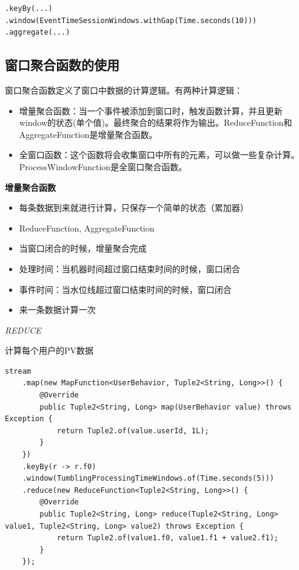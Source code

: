 \documentclass[cn,11pt,chinese]{elegantbook}
\begin{document}
\begin{verbatim}
.keyBy(...)
.window(EventTimeSessionWindows.withGap(Time.seconds(10)))
.aggregate(...)
\end{verbatim}

\subsection{窗口聚合函数的使用}

窗口聚合函数定义了窗口中数据的计算逻辑。有两种计算逻辑：

\begin{itemize}
    \item 增量聚合函数：当一个事件被添加到窗口时，触发函数计算，并且更新window的状态(单个值)。最终聚合的结果将作为输出。ReduceFunction和AggregateFunction是增量聚合函数。
    \item 全窗口函数：这个函数将会收集窗口中所有的元素，可以做一些复杂计算。ProcessWindowFunction是全窗口聚合函数。
\end{itemize}

\textbf{增量聚合函数}

\begin{itemize}
    \item 每条数据到来就进行计算，只保存一个简单的状态（累加器）
    \item ReduceFunction, AggregateFunction
    \item 当窗口闭合的时候，增量聚合完成
    \item 处理时间：当机器时间超过窗口结束时间的时候，窗口闭合
    \item 事件时间：当水位线超过窗口结束时间的时候，窗口闭合
    \item 来一条数据计算一次
\end{itemize}

\textit{REDUCE}

计算每个用户的PV数据

\begin{verbatim}
stream
    .map(new MapFunction<UserBehavior, Tuple2<String, Long>>() {
        @Override
        public Tuple2<String, Long> map(UserBehavior value) throws Exception {
            return Tuple2.of(value.userId, 1L);
        }
    })
    .keyBy(r -> r.f0)
    .window(TumblingProcessingTimeWindows.of(Time.seconds(5)))
    .reduce(new ReduceFunction<Tuple2<String, Long>>() {
        @Override
        public Tuple2<String, Long> reduce(Tuple2<String, Long> value1, Tuple2<String, Long> value2) throws Exception {
            return Tuple2.of(value1.f0, value1.f1 + value2.f1);
        }
    });
\end{verbatim}
\end{document}
